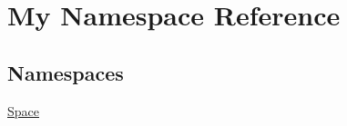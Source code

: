 \hypertarget{namespace_my}{}\section{My Namespace Reference}
\label{namespace_my}
\subsection*{Namespaces}
\begin{DoxyCompactItemize}
\item 
 \mbox{\hyperlink{namespace_my_1_1_space}{Space}}
\end{DoxyCompactItemize}
